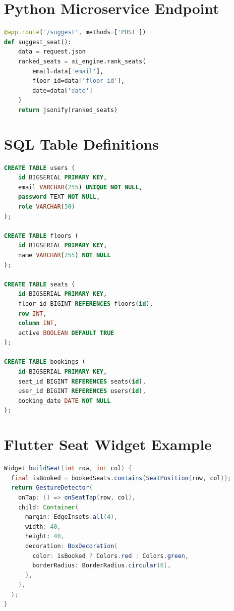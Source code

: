 \documentclass[12pt,a4paper]{report} %
\begin{document}
\section*{Python Microservice Endpoint}
\label{appendix:microservice}

\begin{lstlisting}[language=Python, caption=Seat Suggestion Endpoint (Flask), label=lst:python-endpoint]
@app.route('/suggest', methods=['POST'])
def suggest_seat():
    data = request.json
    ranked_seats = ai_engine.rank_seats(
        email=data['email'],
        floor_id=data['floor_id'],
        date=data['date']
    )
    return jsonify(ranked_seats)
\end{lstlisting}

\section*{SQL Table Definitions}
\label{appendix:sql}

\begin{lstlisting}[language=SQL, caption=Database Schema, label=lst:sql-schema]
CREATE TABLE users (
    id BIGSERIAL PRIMARY KEY,
    email VARCHAR(255) UNIQUE NOT NULL,
    password TEXT NOT NULL,
    role VARCHAR(50)
);

CREATE TABLE floors (
    id BIGSERIAL PRIMARY KEY,
    name VARCHAR(255) NOT NULL
);

CREATE TABLE seats (
    id BIGSERIAL PRIMARY KEY,
    floor_id BIGINT REFERENCES floors(id),
    row INT,
    column INT,
    active BOOLEAN DEFAULT TRUE
);

CREATE TABLE bookings (
    id BIGSERIAL PRIMARY KEY,
    seat_id BIGINT REFERENCES seats(id),
    user_id BIGINT REFERENCES users(id),
    booking_date DATE NOT NULL
);
\end{lstlisting}

\section*{Flutter Seat Widget Example}
\label{appendix:flutter}

\begin{lstlisting}[language=Java, caption=Seat Booking Widget (Flutter), label=lst:flutter-ui]
Widget buildSeat(int row, int col) {
  final isBooked = bookedSeats.contains(SeatPosition(row, col));
  return GestureDetector(
    onTap: () => onSeatTap(row, col),
    child: Container(
      margin: EdgeInsets.all(4),
      width: 40,
      height: 40,
      decoration: BoxDecoration(
        color: isBooked ? Colors.red : Colors.green,
        borderRadius: BorderRadius.circular(6),
      ),
    ),
  );
}
\end{lstlisting}
\end{document}
